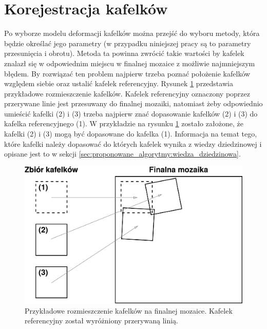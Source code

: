 \section{Korejestracja kafelków}
\label{sec:algorytmy_korejestracji:korejestracja_kafelow}

Po wyborze modelu deformacji kafelków można przejść do wyboru metody, która będzie określać jego parametry (w przypadku niniejszej pracy są to parametry przesunięcia i obrotu). Metoda ta powinna zwrócić takie wartości by kafelek znalazł się w odpowiednim miejscu w finalnej mozaice z możliwie najmniejszym błędem. By rozwiązać ten problem najpierw trzeba poznać położenie kafelków względem siebie oraz ustalić kafelek referencyjny. Rysunek \ref{fig:algorytmy_korejestracji:reference_tile} przedstawia przykładowe rozmieszczenie kafelków. Kafelek referencyjny oznaczony poprzez przerywane linie jest przesuwany do finalnej mozaiki, natomiast żeby odpowiednio umieścić kafelki (2) i (3) trzeba najpierw znać dopasowanie kafelków (2) i (3) do kafelka referencyjnego (1). W przykładzie na rysunku \ref{fig:algorytmy_korejestracji:reference_tile} zostało założone, że kafelki (2) i (3) mogą być dopasowane do kafelka (1). Informacja na temat tego, które kafelki należy dopasować do których kafelek wynika z wiedzy dziedzinowej i opisane jest to w sekcji \ref{sec:proponowane_algorytmy:wiedza_dziedzinowa}.

\begin{figure}[H]
  \centering
  \includegraphics[width=\textwidth]{gfx/reference_tile}
  \caption{Przykładowe rozmieszczenie kafelków na finalnej mozaice. Kafelek referencyjny został wyróżniony przerywaną linią.}
  \label{fig:algorytmy_korejestracji:reference_tile}
\end{figure}

